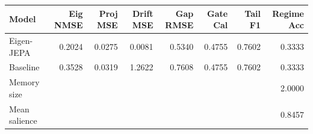 \begin{tabular}{lrrrrrrr}
\toprule
Model & Eig NMSE & Proj MSE & Drift MSE & Gap RMSE & Gate Cal & Tail F1 & Regime Acc \\
\midrule
Eigen-JEPA & 0.2024 & 0.0275 & 0.0081 & 0.5340 & 0.4755 & 0.7602 & 0.3333 \\
Baseline & 0.3528 & 0.0319 & 1.2622 & 0.7608 & 0.4755 & 0.7602 & 0.3333 \\
\midrule
Memory size & \multicolumn{7}{r}{2.0000} \\
Mean salience & \multicolumn{7}{r}{0.8457} \\
\bottomrule
\end{tabular}
